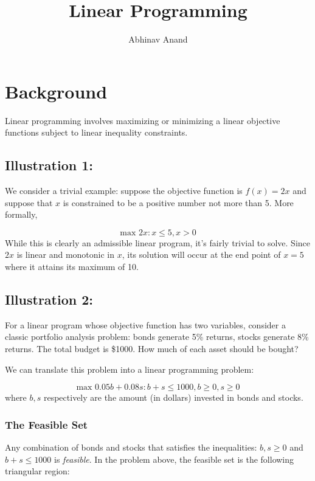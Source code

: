 \documentclass[11pt,]{article}
\title{Linear Programming}
\author{Abhinav Anand}
\date{}
\begin{document}
\maketitle

\section{Background}\label{background}

Linear programming involves maximizing or minimizing a linear objective
functions subject to linear inequality constraints.

\subsection{Illustration 1:}\label{illustration-1}

We consider a trivial example: suppose the objective function is
\(f(x) = 2x\) and suppose that \(x\) is constrained to be a positive
number not more than 5. More formally,

\[
\text{max } 2x: x\leq 5, x>0
\] While this is clearly an admissible linear program, it's fairly
trivial to solve. Since \(2x\) is linear and monotonic in \(x\), its
solution will occur at the end point of \(x=5\) where it attains its
maximum of 10.

\subsection{Illustration 2:}\label{illustration-2}

For a linear program whose objective function has two variables,
consider a classic portfolio analysis problem: bonds generate 5\%
returns, stocks generate 8\% returns. The total budget is \$1000. How
much of each asset should be bought?

We can translate this problem into a linear programming problem:

\[
\text{max } 0.05b+0.08s: b+s\leq 1000, b \geq 0, s \geq 0
\] where \(b, s\) respectively are the amount (in dollars) invested in
bonds and stocks.

\subsubsection{The Feasible Set}\label{the-feasible-set}

Any combination of bonds and stocks that satisfies the inequalities:
\(b ,s \geq 0\) and \(b+s\leq 1000\) is \emph{feasible}. In the problem
above, the feasible set is the following triangular region:
\end{document}
